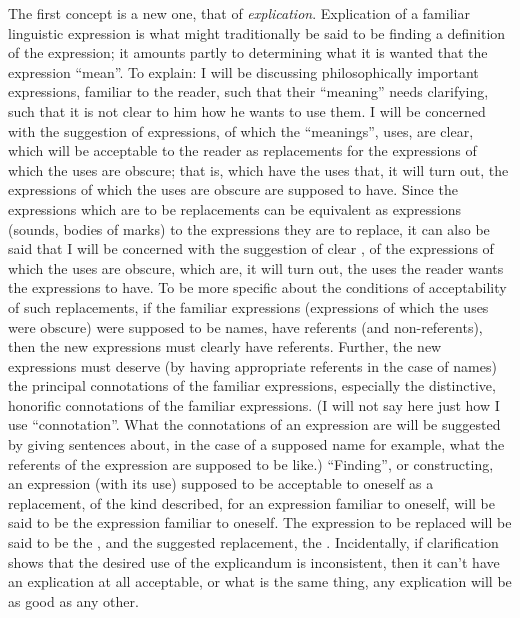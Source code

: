 The first concept is a new one, that of \emph{explication}. Explication of a 
familiar linguistic expression is what might traditionally be said to be finding 
a definition of the expression; it amounts partly to determining what it is 
wanted that the expression \enquote{mean}. To explain: I will be discussing 
philosophically important expressions, familiar to the reader, such that their 
\enquote{meaning} needs clarifying, such that it is not clear to him how he wants to 
use them. I will be concerned with the suggestion of expressions, of which 
the \enquote{meanings}, uses, are clear, which will be acceptable to the reader as 
replacements for the expressions of which the uses are obscure; that is, 
which have the uses that, it will turn out, the expressions of which the uses 
are obscure are supposed to have. Since the expressions which are to be 
replacements can be equivalent as expressions (sounds, bodies of marks) to 
the expressions they are to replace, it can also be said that I will be 
concerned with the suggestion of clear , of the expressions of which the 
uses are obscure, which are, it will turn out, the uses the reader wants the 
expressions to have. To be more specific about the conditions of 
acceptability of such replacements, if the familiar expressions (expressions of 
which the uses were obscure) were supposed to be names, have referents 
(and non-referents), then the new expressions must clearly have referents. 
Further, the new expressions must deserve (by having appropriate referents 
in the case of names) the principal connotations of the familiar expressions, 
especially the distinctive, honorific connotations of the familiar expressions. 
(I will not say here just how I use \enquote{connotation}. What the connotations of 
an expression are will be suggested by giving sentences about, in the case of a 
supposed name for example, what the referents of the expression are 
supposed to be like.) \enquote{Finding}, or constructing, an expression (with its use) 
supposed to be acceptable to oneself as a replacement, of the kind described, 
for an expression familiar to oneself, will be said to be  the 
expression familiar to oneself. The expression to be replaced will be said to 
be the , and the suggested replacement, the . 
Incidentally, if clarification shows that the desired use of the explicandum is 
inconsistent, then it can't have an explication at all acceptable, or what is the 
same thing, any explication will be as good as any other. 

